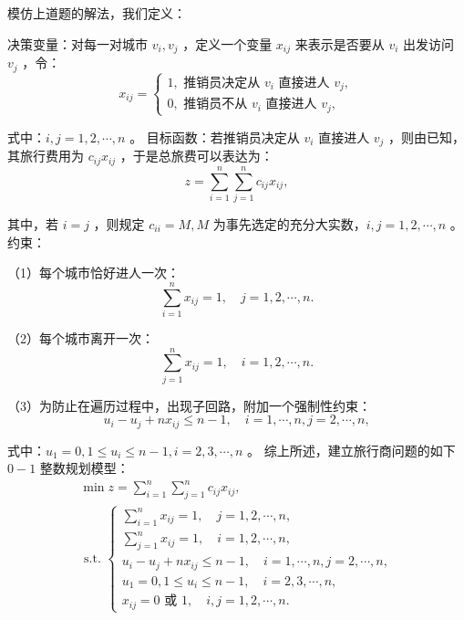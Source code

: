 \begin{solution}
    模仿上道题的解法，我们定义：

    决策变量：对每一对城市 $v_i, v_j$ ，定义一个变量 $x_{i j}$ 来表示是否要从 $v_i$ 出发访问 $v_j$ ，令：
    $$
        x_{i j}=\left\{\begin{array}{l}
            1, \text { 推销员决定从 } v_i \text { 直接进人 } v_j, \\
            0, \text { 推销员不从 } v_i \text { 直接进人 } v_j,
        \end{array}\right.
    $$

    式中：$i, j=1,2, \cdots, n$ 。
    目标函数：若推销员决定从 $v_i$ 直接进人 $v_j$ ，则由已知，其旅行费用为 $c_{i j} x_{i j}$ ，于是总旅费可以表达为：
    $$
        z=\sum_{i=1}^n \sum_{j=1}^n c_{i j} x_{i j},
    $$

    其中，若 $i=j$ ，则规定 $c_{i i}=M, M$ 为事先选定的充分大实数，$i, j=1,2, \cdots, n$ 。
    约束：

    （1）每个城市恰好进人一次：
    $$
        \sum_{i=1}^n x_{i j}=1, \quad j=1,2, \cdots, n .
    $$

    （2）每个城市离开一次：
    $$
        \sum_{j=1}^n x_{i j}=1, \quad i=1,2, \cdots, n .
    $$

    （3）为防止在遍历过程中，出现子回路，附加一个强制性约束：
    $$
        u_i-u_j+n x_{i j} \leqslant n-1, \quad i=1, \cdots, n, j=2, \cdots, n,
    $$

    式中：$u_1=0,1 \leqslant u_i \leqslant n-1, i=2,3, \cdots, n$ 。
    综上所述，建立旅行商问题的如下 $0-1$ 整数规划模型：
    $$
        \begin{gathered}
            \min z=\sum_{i=1}^n \sum_{j=1}^n c_{i j} x_{i j}, \\
            \text { s.t. }\left\{\begin{array}{l}
                \sum_{i=1}^n x_{i j}=1, \quad j=1,2, \cdots, n,                        \\
                \sum_{j=1}^n x_{i j}=1, \quad i=1,2, \cdots, n,                        \\
                u_i-u_j+n x_{i j} \leqslant n-1, \quad i=1, \cdots, n, j=2, \cdots, n, \\
                u_1=0,1 \leqslant u_i \leqslant n-1, \quad i=2,3, \cdots, n,           \\
                x_{i j}=0 \text { 或 } 1, \quad i, j=1,2, \cdots, n .
            \end{array}\right.
        \end{gathered}
    $$
\end{solution}

